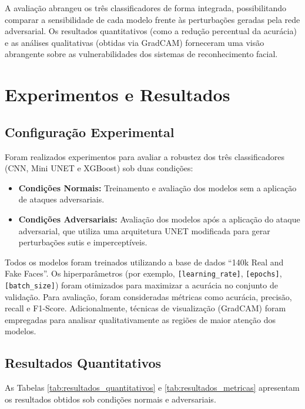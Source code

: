 \documentclass[12pt]{article}
\begin{document}
A avaliação abrangeu os três classificadores de forma integrada, possibilitando
comparar a sensibilidade de cada modelo frente às perturbações geradas pela
rede adversarial. Os resultados quantitativos (como a redução percentual da
acurácia) e as análises qualitativas (obtidas via GradCAM) forneceram uma visão
abrangente sobre as vulnerabilidades dos sistemas de reconhecimento facial.

\section{Experimentos e Resultados}

\subsection{Configuração Experimental}
Foram realizados experimentos para avaliar a robustez dos três classificadores
(CNN, Mini UNET e XGBoost) sob duas condições:
\begin{itemize}
  \item \textbf{Condições Normais:} Treinamento e avaliação dos modelos sem a aplicação de ataques adversariais.
  \item \textbf{Condições Adversariais:} Avaliação dos modelos após a aplicação do ataque adversarial, que utiliza uma arquitetura UNET modificada para gerar perturbações sutis e imperceptíveis.
\end{itemize}

Todos os modelos foram treinados utilizando a base de dados ``140k Real and
Fake Faces''. Os hiperparâmetros (por exemplo, \texttt{[learning\_rate]},
\texttt{[epochs]}, \texttt{[batch\_size]}) foram otimizados para maximizar a
acurácia no conjunto de validação. Para avaliação, foram consideradas métricas
como acurácia, precisão, recall e F1-Score. Adicionalmente, técnicas de
visualização (GradCAM) foram empregadas para analisar qualitativamente as
regiões de maior atenção dos modelos.

\subsection{Resultados Quantitativos}
As Tabelas \ref{tab:resultados_quantitativos} e \ref{tab:resultados_metricas}
apresentam os resultados obtidos sob condições normais e adversariais.
\end{document}
